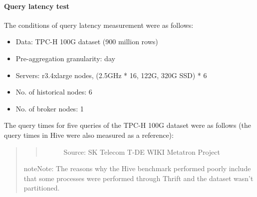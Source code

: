\documentclass[letterpaper,10pt,english]{sphinxmanual}
\begin{document}
\paragraph{Query latency test}
\label{\detokenize{discovery/part01/druid_tests:id3}}
The conditions of query latency measurement were as follows:
\begin{itemize}
\item {} 
Data: TPC-H 100G dataset (900 million rows)

\item {} 
Pre-aggregation granularity: day

\item {} 
Servers: r3.4xlarge nodes, (2.5GHz * 16, 122G, 320G SSD) * 6

\item {} 
No. of historical nodes: 6

\item {} 
No. of broker nodes: 1

\end{itemize}

The query times for five queries of the TPC-H 100G dataset were as follows (the query times in Hive were also measured as a reference):
\begin{quote}
\begin{quote}

\begin{figure}[H]
\centering
\capstart

\noindent{}
\caption{Source: SK Telecom T-DE WIKI Metatron Project}\label{\detokenize{discovery/part01/druid_tests:id15}}\end{figure}
\end{quote}

\begin{sphinxadmonition}{note}{Note:}
The reasons why the Hive benchmark performed poorly include that some processes were performed through Thrift and the dataset wasn’t partitioned.
\end{sphinxadmonition}
\end{quote}
\end{document}

